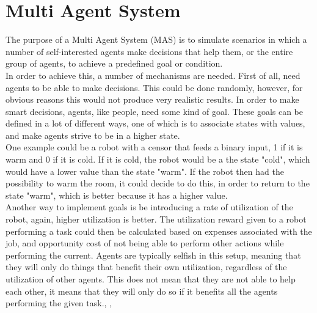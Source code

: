 \chapter{Multi Agent System}
The purpose of a Multi Agent System (MAS) is to simulate scenarios in which a number of self-interested agents make decisions that help them, or the entire group of agents, to achieve a predefined goal or condition.\\

\indent In order to achieve this, a number of mechanisms are needed. First of all, need agents to be able to make decisions. This could be done randomly, however, for obvious reasons this would not produce very realistic results. In order to make smart decisions, agents, like people, need some kind of goal. These goals can be defined in a lot of different ways, one of which is to associate states with values, and make agents strive to be in a higher state.\cite{MAS} \\ 

\indent One example could be a robot with a censor that feeds a binary input, 1 if it is warm and 0 if it is cold. If it is cold, the robot would be a the state "cold", which would have a lower value than the state "warm". If the robot then had the possibility to warm the room, it could decide to do this, in order to return to the state "warm", which is better because it has a higher value.\\

\indent Another way to implement goals is be introducing a rate of utilization of the robot, again, higher utilization is better. The utilization reward given to a robot performing a task could then be calculated based on expenses associated with the job, and opportunity cost of not being able to perform other actions while performing the current. Agents are typically selfish in this setup, meaning that they will only do things that benefit their own utilization, regardless of the utilization of other agents. This does not mean that they are not able to help each other, it means that they will only do so if it benefits all the agents performing the given task.\cite{MAS}, \cite{MAP}, \cite{fundamentalsofMAS}